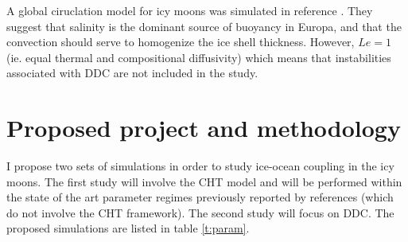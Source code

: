 \documentclass{article}
\begin{document}
A global ciruclation model for icy moons was simulated in reference \citep{yA21}. They suggest that salinity is the dominant source of buoyancy in Europa, and that the convection should serve to homogenize the ice shell thickness. However, $Le=1$ (ie. equal thermal and compositional diffusivity) which means that instabilities associated with DDC are not included in the study.

\section{Proposed project and methodology}
I propose two sets of simulations in order to study ice-ocean coupling in the icy moons. The first study will involve the CHT model and will be performed within the state of the art parameter regimes previously reported by references\citep{dL23,kS19} (which do not involve the CHT framework).
The second study will focus on DDC. The proposed simulations are listed in table \ref{t:param}.
\end{document}
